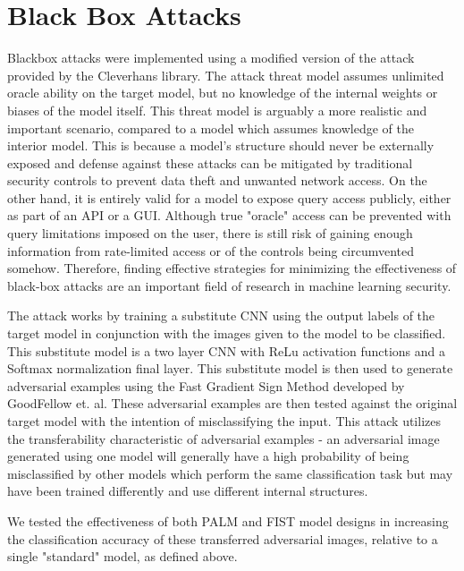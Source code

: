 \section{Black Box Attacks} \label{s:blackboxattacks}
Blackbox attacks were implemented using a modified version of the attack provided by the Cleverhans library\cite{papernot2018cleverhans}.
The attack threat model assumes unlimited oracle ability on the target model, but no knowledge of the internal weights or biases of the model itself.
This threat model is arguably a more realistic and important scenario, compared to a model which assumes knowledge of the interior model.
This is because a model's structure should never be externally exposed and defense against these attacks can be mitigated by traditional security controls to prevent data theft and unwanted network access.
On the other hand, it is entirely valid for a model to expose query access publicly, either as part of an API or a GUI. Although true "oracle" access can be prevented with query limitations imposed on the user, there is still risk of gaining enough information from rate-limited access or of the controls being circumvented somehow.
Therefore, finding effective strategies for minimizing the effectiveness of black-box attacks are an important field of research in machine learning security.

The attack works by training a substitute CNN using the output labels of the target model in conjunction with the images given to the model to be classified.
This substitute model is a two layer CNN with ReLu activation functions and a Softmax normalization final layer.
This substitute model is then used to generate adversarial examples using the Fast Gradient Sign Method developed by GoodFellow et.
al.
These adversarial examples are then tested against the original target model with the intention of misclassifying the input.
This attack utilizes the transferability characteristic of adversarial examples - an adversarial image generated using one model will generally have a high probability of being misclassified by other models which perform the same classification task but may have been trained differently and use different internal structures.

We tested the effectiveness of both PALM and FIST model designs in increasing the classification accuracy of these transferred adversarial images, relative to a single "standard" model, as defined above.